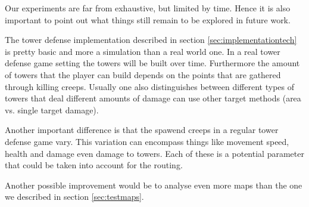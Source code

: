 Our experiments are far from exhaustive, but limited by time. Hence it is also important to point out what things still remain to be explored in future work.

The tower defense implementation described in section \ref{sec:implementationtech} is pretty basic and more a simulation than a real world one.
In a real tower defense game setting the towers will be built over time.  Furthermore the amount of towers that the player can build depends on the points that are gathered through killing creeps.
Usually one also distinguishes between different types of towers that deal different amounts of damage can use other target methods (area vs. single target damage)\cite[P. 57]{hernandez2015mathematics}.

Another important difference is that the spawend creeps in a regular tower defense game vary. This variation can encompass things like movement speed, health and damage even damage to towers\cite[P. 57]{hernandez2015mathematics}. Each of these is a potential parameter that could be taken into account for the routing.

Another possible improvement would be to analyse even more maps than the one we described in section \ref{sec:testmaps}.

